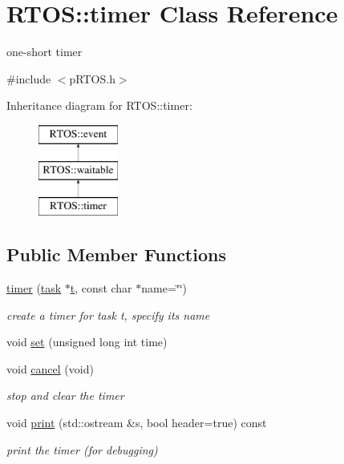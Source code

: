\hypertarget{class_r_t_o_s_1_1timer}{}\section{R\+T\+OS\+:\+:timer Class Reference}
\label{class_r_t_o_s_1_1timer}


one-\/short timer  




{\ttfamily \#include $<$p\+R\+T\+O\+S.\+h$>$}

Inheritance diagram for R\+T\+OS\+:\+:timer\+:\begin{figure}[H]
\begin{center}
\leavevmode
\includegraphics[height=3.000000cm]{class_r_t_o_s_1_1timer}
\end{center}
\end{figure}
\subsection*{Public Member Functions}
\begin{DoxyCompactItemize}
\item 
\hyperlink{class_r_t_o_s_1_1timer_a5a2a759e35dd9d7cea8971db60fbe741}{timer} (\hyperlink{class_r_t_o_s_1_1task}{task} $\ast$\hyperlink{class_r_t_o_s_1_1event_a1402687edb26c1d5d26e54dbda21919d}{t}, const char $\ast$name=\char`\"{}\char`\"{})\hypertarget{class_r_t_o_s_1_1timer_a5a2a759e35dd9d7cea8971db60fbe741}{}\label{class_r_t_o_s_1_1timer_a5a2a759e35dd9d7cea8971db60fbe741}

\begin{DoxyCompactList}\small\item\em create a timer for task t, specify its name \end{DoxyCompactList}\item 
void \hyperlink{class_r_t_o_s_1_1timer_a534e80e413c82507b436ef098f8a7ffb}{set} (unsigned long int time)
\item 
void \hyperlink{class_r_t_o_s_1_1timer_a6df8dddc38d933432131efba05168d10}{cancel} (void)
\begin{DoxyCompactList}\small\item\em stop and clear the timer \end{DoxyCompactList}\item 
void \hyperlink{class_r_t_o_s_1_1timer_aca6725d409de3630e4b8b7883dacbc4f}{print} (std\+::ostream \&s, bool header=true) const \hypertarget{class_r_t_o_s_1_1timer_aca6725d409de3630e4b8b7883dacbc4f}{}\label{class_r_t_o_s_1_1timer_aca6725d409de3630e4b8b7883dacbc4f}

\begin{DoxyCompactList}\small\item\em print the timer (for debugging) \end{DoxyCompactList}\end{DoxyCompactItemize}
